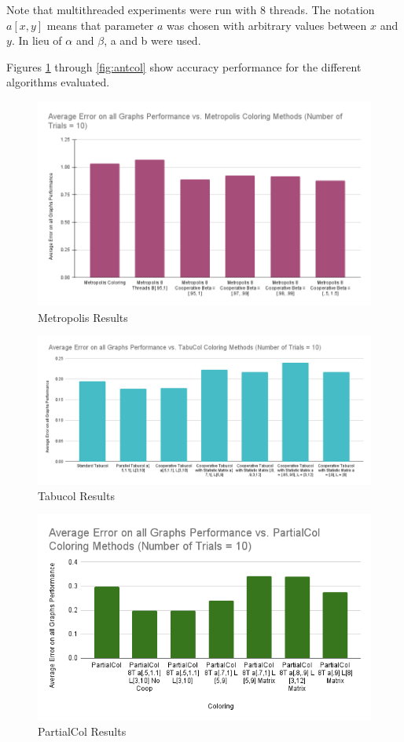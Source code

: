 \documentclass[runningheads]{llncs}
\begin{document}
Note that multithreaded experiments were run with 8 threads. The notation $a[x,y]$ means that parameter $a$ was chosen with arbitrary values between $x$ and $y$. In lieu of $\alpha$ and $\beta$, a and b were used.

Figures \ref{fig:metr1} through \ref{fig:antcol} show accuracy performance for the different algorithms evaluated.

\begin{figure}[!h]
  \centering
  \includegraphics[width=1.125\textwidth]{Metropolis.png}
  \caption{Metropolis Results}
  \label{fig:metr1}
\end{figure}

\begin{figure}[!h]
  \centering
  \includegraphics[width=1\textwidth]{Tabucol.png}
  \caption{Tabucol Results}
  \label{fig:TabuColl}
\end{figure}

\begin{figure}[!h]
  \centering
  \includegraphics[width=1\textwidth]{PartialCol.png}
  \caption{PartialCol Results}
  \label{fig:partialcol}
\end{figure}
\end{document}
